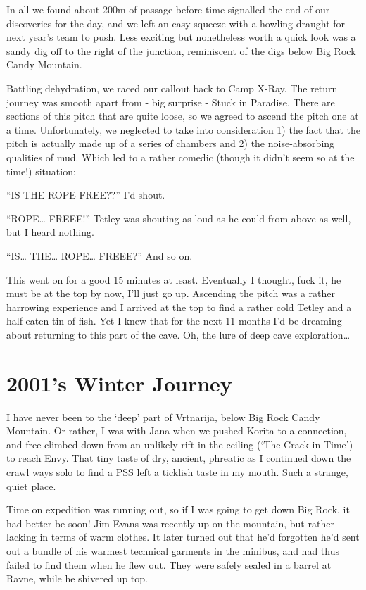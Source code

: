 In all we found about 200m of passage before time signalled the end of
our discoveries for the day, and we left an easy squeeze with a howling
draught for next year's team to push. Less exciting but nonetheless
worth a quick look was a sandy dig off to the right of the junction,
reminiscent of the digs below Big Rock Candy Mountain.

Battling dehydration, we raced our callout back to Camp X-Ray. The
return journey was smooth apart from - big surprise - Stuck in Paradise.
There are sections of this pitch that are quite loose, so we agreed to
ascend the pitch one at a time. Unfortunately, we neglected to take into
consideration 1) the fact that the pitch is actually made up of a series
of chambers and 2) the noise-absorbing qualities of mud. Which led to a
rather comedic (though it didn't seem so at the time!) situation:

``IS THE ROPE FREE??'' I'd shout.

``ROPE\ldots{} FREEE!'' Tetley was shouting as loud as he could from
above as well, but I heard nothing.

``IS\ldots{} THE\ldots{} ROPE\ldots{} FREEE?'' And so on.

This went on for a good 15 minutes at least. Eventually I thought, fuck
it, he must be at the top by now, I'll just go up. Ascending the pitch
was a rather harrowing experience and I arrived at the top to find a
rather cold Tetley and a half eaten tin of fish. Yet I knew that for the
next 11 months I'd be dreaming about returning to this part of the cave.
Oh, the lure of deep cave exploration\ldots{}


\section{2001's Winter Journey}

I have never been to the `deep' part of Vrtnarija, below Big Rock Candy
Mountain. Or rather, I was with Jana when we pushed Korita to a
connection, and free climbed down from an unlikely rift in the ceiling
(`The Crack in Time') to reach Envy. That tiny taste of dry, ancient,
phreatic as I continued down the crawl ways solo to find a PSS left a
ticklish taste in my mouth. Such a strange, quiet place.

Time on expedition was running out, so if I was going to get down Big
Rock, it had better be soon! Jim Evans was recently up on the mountain,
but rather lacking in terms of warm clothes. It later turned out that
he'd forgotten he'd sent out a bundle of his warmest technical garments
in the minibus, and had thus failed to find them when he flew out. They
were safely sealed in a barrel at Ravne, while he shivered up top.

